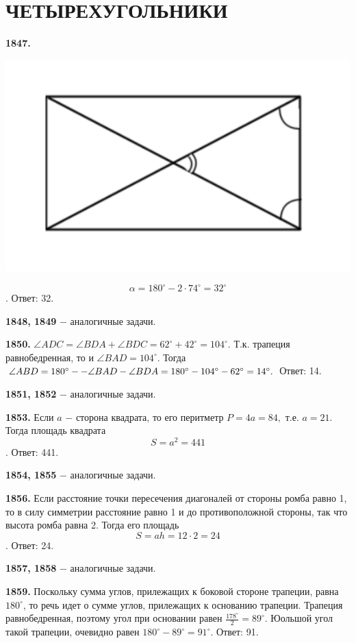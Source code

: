 \section{ЧЕТЫРЕХУГОЛЬНИКИ}

\textbf{1847.}

{\centering \includegraphics[width=0.5\linewidth]{Geometry/Content/19.png}
	
}
\[
\alpha = 180^\circ - 2\cdot 74^\circ = 32^\circ
\]. \null \hspace*{\fill} Ответ: 32.

\textbf{1848, 1849} $-$ аналогичные задачи.

\textbf{1850.} $\angle ADC = \angle BDA + \angle BDC = 62^\circ + 42^\circ = 104^\circ.$ Т.к. трапеция равнобедренная, то и $\angle BAD = 104^\circ$. Тогда $\angle ABD = 180^\circ -\linebreak- \angle BAD - \angle BDA = 180^\circ - 104^\circ - 62^\circ = 14^\circ.$ \newline \null \hspace*{\fill} Ответ: 14.

\textbf{1851, 1852} $-$ аналогичные задачи.

\textbf{1853.} Если $a$ $-$ сторона квадрата, то его перитметр $P = 4a = 84,$ т.е. $a = 21$. Тогда площадь квадрата 
\[
S = a^2 = 441
\].\null \hspace*{\fill} Ответ: 441.

\textbf{1854, 1855} $-$ аналогичные задачи.

\textbf{1856.} Если расстояние точки пересечения диагоналей от стороны ромба равно 1, то в силу симметрии расстояние равно 1 и до противоположной стороны, так что высота ромба равна 2. Тогда его площадь 
\[
S = ah = 12\cdot 2 = 24
\].\null \hspace*{\fill} Ответ: 24.

\textbf{1857, 1858} $-$ аналогичные задачи.

\textbf{1859.} Поскольку сумма углов, прилежащих к боковой стороне трапеции, равна $180^\circ$, то речь идет о сумме углов, прилежащих к основанию трапеции. Трапеция равнобедренная, поэтому угол при основании равен $\frac{178^\circ}{2} = 89^\circ$. Юольшой угол такой трапеции, очевидно равен $180^\circ - 89^\circ = 91^\circ.$ \newline \null \hspace*{\fill} Ответ: 91.


